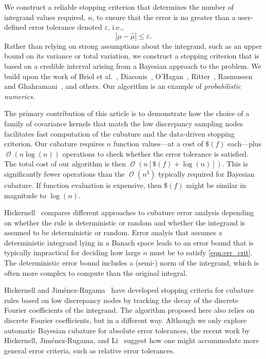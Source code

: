 \documentclass[twocolumn]{svjour3}          %
\DeclareMathOperator{\Order}{{\mathcal O}}
\newcommand{\hmu}{\widehat{\mu}}
\newcommand{\errtol}{\varepsilon}
\def\abs#1{\ensuremath{\left \lvert #1 \right \rvert}}
\begin{document}
We construct a reliable stopping criterion that determines the number of integrand values required, $n$, to ensure that the error is no greater than a user-defined error tolerance denoted $\varepsilon$, i.e., 
\begin{equation}
\label{eqn:err_crit} 
\abs{\mu - \hmu} \leq \errtol .
\end{equation}
Rather than relying on strong assumptions about the integrand, such as an upper bound on its variance or total variation, we construct a stopping criterion that is based on a credible interval arising from a Bayesian approach to the problem.  We build upon the work of Briol et al.~\cite{BriEtal18a}, Diaconis~\cite{Dia88a}, O'Hagan~\cite{OHa91a}, Ritter~\cite{Rit00a}, Rasmussen and Ghahramani~\cite{RasGha03a}, and others.  Our algorithm is an example of \emph{probabilistic numerics}.

The primary contribution of this article is to demonstrate how the choice of a family of covariance kernels that match the low discrepancy sampling nodes facilitates fast computation of the cubature and the data-driven stopping criterion.  Our cubature requires $n$ function values---at a cost of $\$(f)$ each---plus $\Order(n \log(n))$ operations to check whether the error tolerance is satisfied.  The total cost of our algorithm is then $\Order(n [\$(f) + \log(n)])$.  This is significantly fewer operations than the $\Order(n^3)$ typically required for Bayesian cubature.  If function evaluation is expensive, then $\$(f)$ might be similar in magnitude to $\log(n)$.

Hickernell~\cite{Hic17a} compares different approaches to cubature error analysis depending on whether the rule is deterministic or random and whether the integrand is assumed to be deterministic or random.  Error analyis that assumes a deterministic integrand lying in a Banach space leads to an error bound that is typically impractical for deciding how large $n$ must be to satisfy \eqref{eqn:err_crit}.  The deterministic error bound includes a (semi-) norm of the integrand, which is often more complex to compute than the original integral.

Hickernell and Jim\'enez-Rugama~\cite{HicJim16a,JimHic16a} have developed stopping criteria for cubature rules based on low discrepancy nodes by tracking the decay of the discrete Fourier coefficients of the integrand.  The algorithm proposed here also relies on discrete Fourier coefficients, but in a different way.  Although we only explore automatic Bayesian cubature for absolute error tolerances, the recent work by Hickernell, Jim\'enez-Rugama, and Li~\cite{HicEtal17a} suggest how one might accommodate more general error criteria, such as relative error tolerances.
\end{document}
